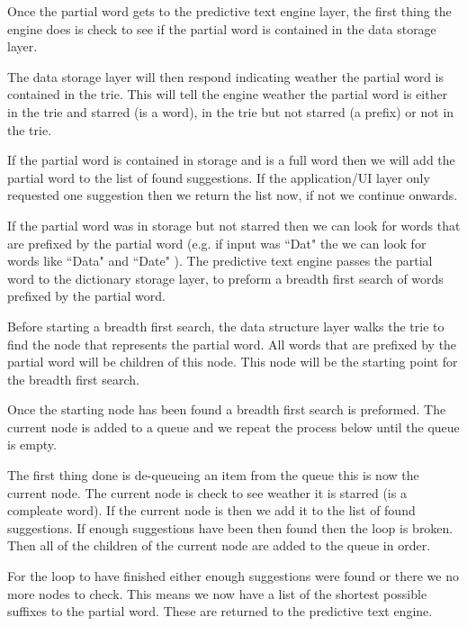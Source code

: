 \documentclass[10pt]{article} %
\begin{document}
            Once the partial word gets to the predictive text engine layer, the first thing the engine does is check to see if the partial word is contained in the data storage layer. 
            
            The data storage layer will then respond indicating weather the partial word is contained in the trie. This will tell the engine weather the partial word is either in the trie and starred (is a word), in the trie but not starred (a prefix) or not in the trie.
            
            If the partial word is contained in storage and is a full word then we will add the partial word to the list of found suggestions. If the application/UI layer only requested one suggestion then we return the list now, if not we continue onwards.
            
            If the partial word was in storage but not starred then we can look for words that are prefixed by the partial word (e.g. if input was ``Dat" the we can look for words like ``Data" and ``Date" ). The predictive text engine passes the partial word to the dictionary storage layer, to preform a breadth first search of words prefixed by the partial word.
            
            Before starting a breadth first search, the data structure layer walks the trie to find the node that represents the partial word. All words that are prefixed by the partial word will be children of this node. This node will be the starting point for the breadth first search.
            
            Once the starting node has been found a breadth first search is preformed. The current node is added to a queue and we repeat the process below until the queue is empty.
            
            The first thing done is de-queueing an item from the queue this is now the current node.
            The current node is check to see weather it is starred (is a compleate word). If the current node is then we add it to the list of found suggestions. If enough suggestions have been then found then the loop is broken.
            Then all of the children of the current node are added to the queue in order.
            
            For the loop to have finished either enough suggestions were found or there we no more nodes to check. This means we now have a list of the shortest possible suffixes to the partial word. These are returned to the predictive text engine.
            
\end{document}
